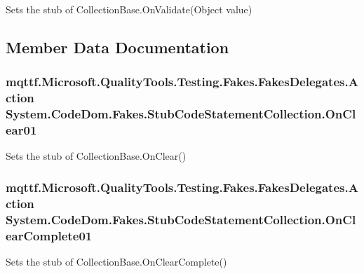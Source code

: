Sets the stub of Collection\-Base.\-On\-Validate(\-Object value)



\subsection{Member Data Documentation}
\hypertarget{class_system_1_1_code_dom_1_1_fakes_1_1_stub_code_statement_collection_a52d5ec59905f79dcea55af61f72e3922}{
\subsubsection[{On\-Clear01}]{\setlength{\rightskip}{0pt plus 5cm}mqttf.\-Microsoft.\-Quality\-Tools.\-Testing.\-Fakes.\-Fakes\-Delegates.\-Action System.\-Code\-Dom.\-Fakes.\-Stub\-Code\-Statement\-Collection.\-On\-Clear01}}\label{class_system_1_1_code_dom_1_1_fakes_1_1_stub_code_statement_collection_a52d5ec59905f79dcea55af61f72e3922}


Sets the stub of Collection\-Base.\-On\-Clear()

\hypertarget{class_system_1_1_code_dom_1_1_fakes_1_1_stub_code_statement_collection_a321b874317a244188e1e1327cd8782e3}{
\subsubsection[{On\-Clear\-Complete01}]{\setlength{\rightskip}{0pt plus 5cm}mqttf.\-Microsoft.\-Quality\-Tools.\-Testing.\-Fakes.\-Fakes\-Delegates.\-Action System.\-Code\-Dom.\-Fakes.\-Stub\-Code\-Statement\-Collection.\-On\-Clear\-Complete01}}\label{class_system_1_1_code_dom_1_1_fakes_1_1_stub_code_statement_collection_a321b874317a244188e1e1327cd8782e3}


Sets the stub of Collection\-Base.\-On\-Clear\-Complete()

